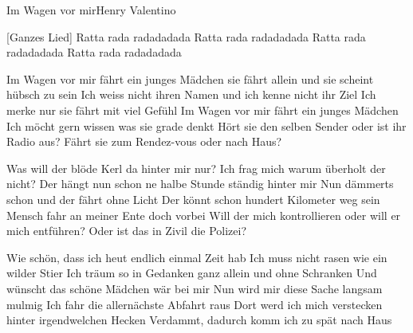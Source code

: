 \begin{song}{Im Wagen vor mir}{Henry Valentino}{}

[Ganzes Lied]
Ratta rada radadadada Ratta rada radadadada
Ratta rada radadadada Ratta rada radadadada

Im Wagen vor mir fährt ein junges Mädchen
sie fährt allein und sie scheint hübsch zu sein
Ich weiss nicht ihren Namen und ich kenne nicht ihr Ziel
Ich merke nur sie fährt mit viel Gefühl
Im Wagen vor mir fährt ein junges Mädchen
Ich möcht gern wissen was sie grade denkt
Hört sie den selben Sender oder ist ihr Radio aus?
Fährt sie zum Rendez-vous oder nach Haus?

 

Was will der blöde Kerl da hinter mir nur? 
Ich frag mich warum überholt der nicht? 
Der hängt nun schon ne halbe Stunde ständig hinter mir
Nun dämmerts schon und der fährt ohne Licht 
Der könnt schon hundert Kilometer weg sein 
Mensch fahr an meiner Ente doch vorbei 
Will der mich kontrollieren oder will er mich entführen?
Oder ist das in Zivil die Polizei?

 

Wie schön, dass ich heut endlich einmal Zeit hab
Ich muss nicht rasen wie ein wilder Stier
Ich träum so in Gedanken ganz allein und ohne Schranken
Und wünscht das schöne Mädchen wär bei mir
Nun wird mir diese Sache langsam mulmig 
Ich fahr die allernächste Abfahrt raus 
Dort werd ich mich verstecken hinter irgendwelchen Hecken
Verdammt, dadurch komm ich zu spät nach Haus


\end{song}
